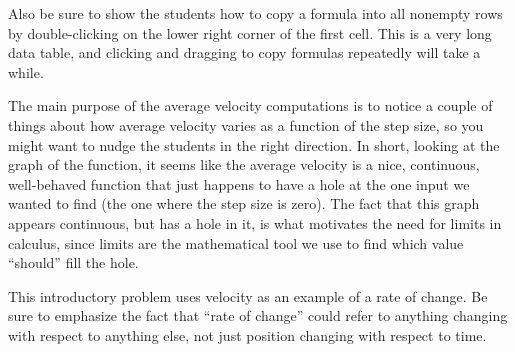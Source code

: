 Also be sure to show the students how to copy a formula into all nonempty rows by double-clicking on the lower right corner of the first cell. This is a very long data table, and clicking and dragging to copy formulas repeatedly will take a while.

The main purpose of the average velocity computations is to notice a couple of things about how average velocity varies as a function of the step size, so you might want to nudge the students in the right direction. In short, looking at the graph of the function, it seems like the average velocity is a nice, continuous, well-behaved function that just happens to have a hole at the one input we wanted to find (the one where the step size is zero). The fact that this graph appears continuous, but has a hole in it, is what motivates the need for limits in calculus, since limits are the mathematical tool we use to find which value ``should'' fill the hole.

This introductory problem uses velocity as an example of a rate of change. Be sure to emphasize the fact that ``rate of change'' could refer to anything changing with respect to anything else, not just position changing with respect to time.


